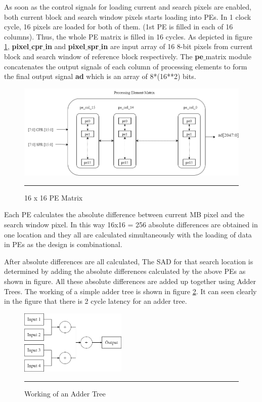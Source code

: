 As soon as the control signals for loading current and search pixels are enabled, both current block and search window pixels starts loading into PEs. In 1 clock cycle, 16 pixels are loaded for both of them. (1st PE is filled in each of 16 columns). Thus, the whole PE matrix is filled in 16 cycles. As depicted in figure \ref{fig:pematrix}, \textbf{pixel$\_$cpr$\_$in} and \textbf{pixel$\_$spr$\_$in} are input array of 16 8-bit pixels from current block and search window of reference block respectively. The \textbf{pe$\_$}matrix module concatenates the output signals of each column of processing elements to form the final output signal \textbf{ad} which is an array of 8*(16**2) bits. 

\begin{figure}[htbp]
	\centering
	\includegraphics[width = 4.5in]{./Figures/pematrix.png}
	\rule{35em}{0.5pt}
	\caption{16 x 16 PE Matrix}
	\label{fig:pematrix}
\end{figure}

Each PE calculates the absolute difference between current MB pixel and the search window pixel. In this way 16x16 = 256 absolute differences are obtained in one location and they all are calculated simultaneously with the loading of data in PEs as the design is combinational. 

After absolute differences are all calculated, The SAD for that search location is determined by adding the absolute differences calculated by the above PEs as shown in figure. All these absolute differences are added up together using Adder Trees. The working of a simple adder tree is shown in figure \ref{fig:addertree}. It can seen clearly in the figure that there is 2 cycle latency for an adder tree. 

\begin{figure}[htbp]
	\centering
	\includegraphics[width = 2in]{./Figures/addertree.png}
	\rule{35em}{0.5pt}
	\caption{Working of an Adder Tree}
	\label{fig:addertree}
\end{figure}

